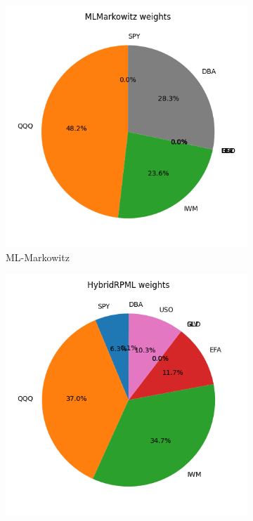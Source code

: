 \documentclass[11pt,a4paper]{article}
\begin{document}
\begin{figure}[h]
  \vspace{0.5em}
  \begin{subfigure}[b]{0.48\textwidth}
    \centering
    \includegraphics[width=\linewidth]{../../figures/MLMarkowitz_weights_generated.png}
    \caption{ML-Markowitz}
  \end{subfigure}
  \hfill
  \begin{subfigure}[b]{0.48\textwidth}
    \centering
    \includegraphics[width=\linewidth]{../../figures/HybridRPML_weights_generated.png}

\end{subfigure}
\end{figure}
\end{document}
